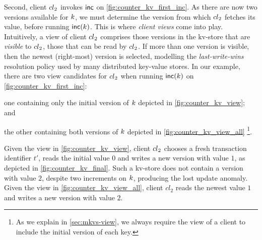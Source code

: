 Second, client \({cl}_2\) invokes \(\mathsf{inc}\) on
\cref{fig:counter_kv_first_inc}.  As there are now two versions
available for \(k\), we must determine the version from which
\({cl}_2\) fetches its value, before running \(\mathsf{inc}(k)\).  This is
where \emph{client views} come into play.  Intuitively, a view of
client \({cl}_2\) comprises those versions in the kv-store that are
\emph{visible} to \({cl}_2\), \ie those that can be read by
\({cl}_2\).  If more than one version is visible, then the newest
(right-most) version is selected, modelling the \emph{last-write-wins}
resolution policy used by many distributed key-value stores.
In our example, there are two view candidates for \({cl}_2\) when running
\(\mathsf{inc}(k)\) on \cref{fig:counter_kv_first_inc}: 
\begin{enumerate*}
\item one containing
only the initial version of \(k\) depicted in \cref{fig:counter_kv_view}; and
\item the other containing both versions of \(k\) depicted in \cref{fig:counter_kv_view_all}%
\footnote{As we explain in \cref{sec:mkvs-view}, we always require
  the view of a client to include the initial version of each key.}.
\end{enumerate*}
Given the view in \cref{fig:counter_kv_view},
client \({cl}_2\) chooses a fresh
transaction identifier \(t'\), reads the initial value \(0\) and writes a
new version with value \(1\), as depicted in \cref{fig:counter_kv_final}. 
Such a kv-store does not contain a
version with value \(2\), despite two increments on \(k\), producing
the lost update anomaly. 
Given the view in \cref{fig:counter_kv_view_all},
client \(cl_2\) reads the newest
value \(1\) and writes a new version with value \(2\).

